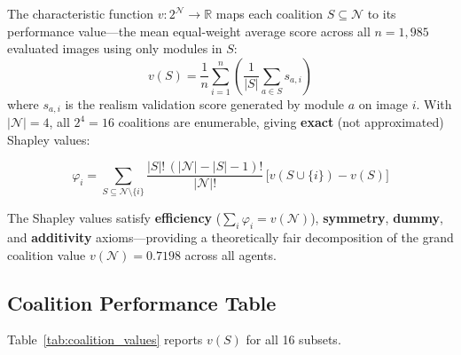 \documentclass[12pt,onecolumn,a4paper]{IEEEtran}
\begin{document}
The characteristic function $v: 2^\mathcal{N} \to \mathbb{R}$ maps each coalition $S \subseteq \mathcal{N}$ to its performance value---the mean equal-weight average score across all $n = 1{,}985$ evaluated images using only modules in $S$:
\begin{equation}
  v(S) = \frac{1}{n} \sum_{i=1}^n \left( \frac{1}{|S|} \sum_{a \in S} s_{a, i} \right)
\end{equation}
where $s_{a,i}$ is the realism validation score generated by module $a$ on image $i$. With $|\mathcal{N}| = 4$, all $2^4 = 16$ coalitions are enumerable, giving \textbf{exact} (not approximated) Shapley values:

\begin{equation}
  \varphi_i = \sum_{S \subseteq \mathcal{N} \setminus \{i\}} \frac{|S|!\,(|\mathcal{N}|-|S|-1)!}{|\mathcal{N}|!}\,\bigl[v(S \cup \{i\}) - v(S)\bigr]
  \label{eq:shapley}
\end{equation}

The Shapley values satisfy \textbf{efficiency} ($\sum_i \varphi_i = v(\mathcal{N})$), \textbf{symmetry}, \textbf{dummy}, and \textbf{additivity} axioms---providing a theoretically fair decomposition of the grand coalition value $v(\mathcal{N}) = 0.7198$ across all agents.

\subsection{Coalition Performance Table}

Table~\ref{tab:coalition_values} reports $v(S)$ for all 16 subsets.
\end{document}
